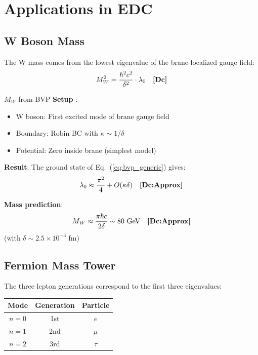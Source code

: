 \section{Applications in EDC}
\label{sec:bvp_applications}

\subsection{W Boson Mass}

The W mass comes from the lowest eigenvalue of the brane-localized
gauge field:
\begin{equation}
M_W^2 = \frac{\hbar^2 c^2}{\delta^2} \cdot \lambda_0 \quad \textbf{[Dc]}
\end{equation}

\begin{mechanism}{$M_W$ from BVP}
\textbf{Setup} \tagP{}:
\begin{itemize}[nosep]
\item W boson: First excited mode of brane gauge field
\item Boundary: Robin BC with $\kappa \sim 1/\delta$
\item Potential: Zero inside brane (simplest model)
\end{itemize}

\textbf{Result}:
The ground state of Eq.~(\ref{eq:bvp_generic}) gives:
\begin{equation}
\lambda_0 \approx \frac{\pi^2}{4} + O(\kappa\delta) \quad \textbf{[Dc:Approx]}
\end{equation}

\textbf{Mass prediction}:
\begin{equation}
M_W \approx \frac{\pi \hbar c}{2\delta} \sim 80 \text{ GeV} \quad \textbf{[Dc:Approx]}
\end{equation}
(with $\delta \sim 2.5 \times 10^{-3}$ fm)
\end{mechanism}

\subsection{Fermion Mass Tower}

The three lepton generations correspond to the first three eigenvalues:

\begin{center}
\begin{tabular}{ccc}
\toprule
\textbf{Mode} & \textbf{Generation} & \textbf{Particle} \\
\midrule
$n = 0$ & 1st & $e$ \\
$n = 1$ & 2nd & $\mu$ \\
$n = 2$ & 3rd & $\tau$ \\
\bottomrule
\end{tabular}
\end{center}

